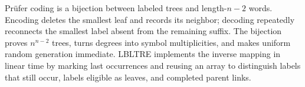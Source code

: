 \documentclass[10pt,letterpaper]{article}
\begin{document}
\begin{tcolorbox}[colback=Ink!4,colframe=Ink,title=Cornell summary]
Pr\"ufer coding is a bijection between labeled trees and length-$n-2$ words. Encoding deletes the smallest leaf and records its neighbor; decoding repeatedly reconnects the smallest label absent from the remaining suffix. The bijection proves $n^{n-2}$ trees, turns degrees into symbol multiplicities, and makes uniform random generation immediate. LBLTRE implements the inverse mapping in linear time by marking last occurrences and reusing an array to distinguish labels that still occur, labels eligible as leaves, and completed parent links.
\end{tcolorbox}
\end{document}
